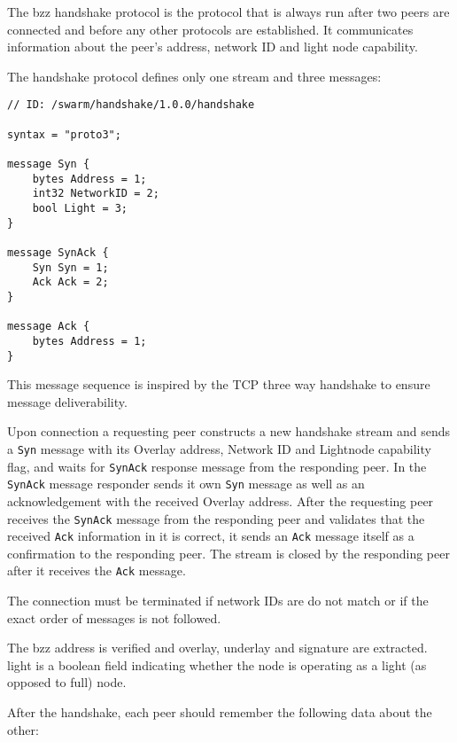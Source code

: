 

The bzz handshake protocol is the protocol that is always run after two peers are connected and before any other protocols are established. It communicates information about the  peer's address, network ID and light node capability.

The handshake protocol defines only one stream and three messages:

\begin{definition}\label{def:bzz-messages}

\begin{lstlisting}
// ID: /swarm/handshake/1.0.0/handshake

syntax = "proto3";

message Syn {
    bytes Address = 1;
    int32 NetworkID = 2;
    bool Light = 3;
}

message SynAck {
    Syn Syn = 1;
    Ack Ack = 2;
}

message Ack {
    bytes Address = 1;
}
\end{lstlisting}
\end{definition}

This message sequence is inspired by the TCP three way handshake to ensure message deliverability.

Upon connection a requesting peer constructs a new handshake stream and sends a \lstinline{Syn} message with its Overlay address, Network ID and Lightnode capability flag, and waits for \lstinline{SynAck} response message from the responding peer. In  the  \lstinline{SynAck} message responder sends it own \lstinline{Syn} message as well as an acknowledgement with the received Overlay address. After the requesting peer receives the \lstinline{SynAck} message from the responding peer and validates that the received \lstinline{Ack} information in it is correct, it sends an \lstinline{Ack} message itself as a confirmation to the responding peer. The stream is closed by the responding peer after it receives the \lstinline{Ack} message.

The connection must be terminated if network IDs are do not match or if the  exact  order of messages is not followed.

The bzz address is verified and overlay, underlay and signature are extracted.
light is a boolean field indicating whether the node is operating as a light (as opposed to full) node.

After the handshake,  each peer should remember the following data about the other:

